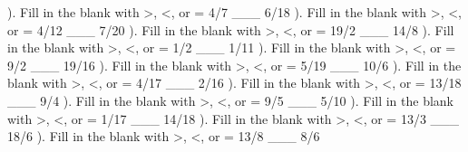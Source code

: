 \documentclass{article}%
\begin{document}
\newline%
\newline%
). Fill in the blank with >, <, or = 4/7 \_\_\_ 6/18%
\newline%
\newline%
). Fill in the blank with >, <, or = 4/12 \_\_\_ 7/20%
\newline%
\newline%
). Fill in the blank with >, <, or = 19/2 \_\_\_ 14/8%
\newline%
\newline%
). Fill in the blank with >, <, or = 1/2 \_\_\_ 1/11%
\newline%
\newline%
). Fill in the blank with >, <, or = 9/2 \_\_\_ 19/16%
\newline%
\newline%
). Fill in the blank with >, <, or = 5/19 \_\_\_ 10/6%
\newline%
\newline%
). Fill in the blank with >, <, or = 4/17 \_\_\_ 2/16%
\newline%
\newline%
). Fill in the blank with >, <, or = 13/18 \_\_\_ 9/4%
\newline%
\newline%
). Fill in the blank with >, <, or = 9/5 \_\_\_ 5/10%
\newline%
\newline%
). Fill in the blank with >, <, or = 1/17 \_\_\_ 14/18%
\newline%
\newline%
). Fill in the blank with >, <, or = 13/3 \_\_\_ 18/6%
\newline%
\newline%
). Fill in the blank with >, <, or = 13/8 \_\_\_ 8/6%
\newline%
\newline%
\newline%
\end{document}
